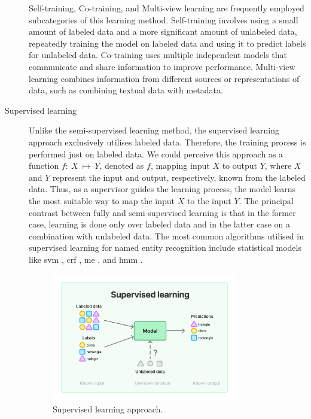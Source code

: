 \begin{description}
    Self-training, Co-training, and Multi-view learning are frequently employed subcategories of this learning method. Self-training involves using a small amount of labeled data and a more significant amount of unlabeled data, repeatedly training the model on labeled data and using it to predict labels for unlabeled data. Co-training uses multiple independent models that communicate and share information to improve performance. Multi-view learning combines information from different sources or representations of data, such as combining textual data with metadata.
    \item[Supervised learning] Unlike the semi-supervised learning method, the supervised learning approach exclusively utilises labeled data. Therefore, the training process is performed just on labeled data. We could perceive this approach as a function $f:~X~\mapsto~Y$, denoted as $f$, mapping input $X$ to output $Y$, where $X$ and $Y$ represent the input and output, respectively, known from the labeled data. Thus, as a supervisor guides the learning process, the model learns the most suitable way to map the input $X$ to the input $Y$. The principal contrast between fully and semi-supervised learning is that in the former case, learning is done only over labeled data and in the latter case on a combination with unlabeled data. The most common algorithms utilised in supervised learning for named entity recognition include statistical models like \acrfull{svm} \parencite{wang2005svm}, \acrfull{crf} \parencite{sutton2012crf}, \acrfull{me} \parencite{berger1996me}, and \acrfull{hmm} \parencite{EDDY1996361hmm}.
    \begin{figure}[H]
        \centering
        \includegraphics[width=0.8\textwidth, interpolate=false]{img/theoretical/supervised.pdf}
        \caption{Supervised learning approach.}
        \label{fig:supervised-learning}

\end{figure}
\end{description}
